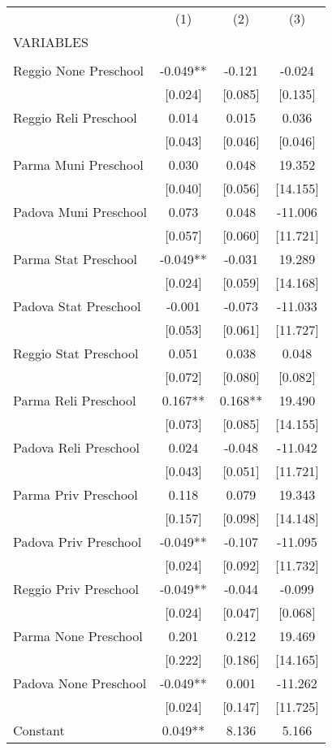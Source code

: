 \begin{tabular}{lccc} \hline
 & (1) & (2) & (3) \\
VARIABLES &  &  &  \\ \hline
 &  &  &  \\
Reggio None Preschool & -0.049** & -0.121 & -0.024 \\
 & [0.024] & [0.085] & [0.135] \\
Reggio Reli Preschool & 0.014 & 0.015 & 0.036 \\
 & [0.043] & [0.046] & [0.046] \\
Parma Muni Preschool & 0.030 & 0.048 & 19.352 \\
 & [0.040] & [0.056] & [14.155] \\
Padova Muni Preschool & 0.073 & 0.048 & -11.006 \\
 & [0.057] & [0.060] & [11.721] \\
Parma Stat Preschool & -0.049** & -0.031 & 19.289 \\
 & [0.024] & [0.059] & [14.168] \\
Padova Stat Preschool & -0.001 & -0.073 & -11.033 \\
 & [0.053] & [0.061] & [11.727] \\
Reggio Stat Preschool & 0.051 & 0.038 & 0.048 \\
 & [0.072] & [0.080] & [0.082] \\
Parma Reli Preschool & 0.167** & 0.168** & 19.490 \\
 & [0.073] & [0.085] & [14.155] \\
Padova Reli Preschool & 0.024 & -0.048 & -11.042 \\
 & [0.043] & [0.051] & [11.721] \\
Parma Priv Preschool & 0.118 & 0.079 & 19.343 \\
 & [0.157] & [0.098] & [14.148] \\
Padova Priv Preschool & -0.049** & -0.107 & -11.095 \\
 & [0.024] & [0.092] & [11.732] \\
Reggio Priv Preschool & -0.049** & -0.044 & -0.099 \\
 & [0.024] & [0.047] & [0.068] \\
Parma None Preschool & 0.201 & 0.212 & 19.469 \\
 & [0.222] & [0.186] & [14.165] \\
Padova None Preschool & -0.049** & 0.001 & -11.262 \\
 & [0.024] & [0.147] & [11.725] \\
Constant & 0.049** & 8.136 & 5.166 \\

\end{tabular}
